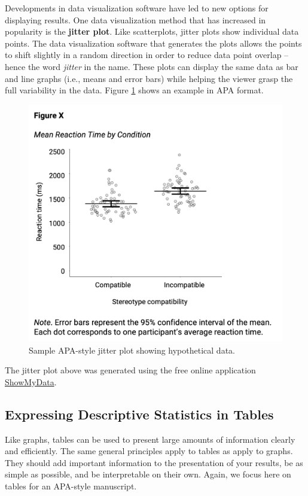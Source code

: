 \documentclass[
]{krantz}
\begin{document}
Developments in data visualization software have led to new options for displaying results. One data visualization method that has increased in popularity is the \textbf{jitter plot}. Like scatterplots, jitter plots show individual data points. The data visualization software that generates the plots allows the points to shift slightly in a random direction in order to reduce data point overlap -- hence the word \emph{jitter} in the name. These plots can display the same data as bar and line graphs (i.e., means and error bars) while helping the viewer grasp the full variability in the data. Figure \ref{fig:apajitter} shows an example in APA format.

\begin{figure}

{\centering \includegraphics[width=0.7\linewidth]{images/ch12/apajitter} 

}

\caption{Sample APA-style jitter plot showing hypothetical data.}\label{fig:apajitter}
\end{figure}

The jitter plot above was generated using the free online application \href{https://www.showmydata.org/}{ShowMyData}.

\hypertarget{expressing-descriptive-statistics-in-tables}{%
\subsection*{Expressing Descriptive Statistics in Tables}\label{expressing-descriptive-statistics-in-tables}}


Like graphs, tables can be used to present large amounts of information clearly and efficiently. The same general principles apply to tables as apply to graphs. They should add important information to the presentation of your results, be as simple as possible, and be interpretable on their own. Again, we focus here on tables for an APA-style manuscript.
\end{document}
